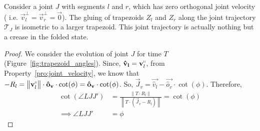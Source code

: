 \begin{lemma}
\label{lem:trapezoid_gluing_parallel}
Consider a joint $J$ with segments $l$ and $r$,
which has zero orthogonal joint velocity ( i.e. $\vec v_l^\perp = \vec v_r^\perp = \vec 0$).
The gluing of trapezoids $Z_l$ and $Z_r$ along the joint trajectory $\mathcal T_J$ is isometric to a larger trapezoid.
This joint trajectory is actually nothing but a crease in the folded state.
\end{lemma}
\begin{proof}
We consider the evolution of joint $J$ for time $T$ (Figure~\ref{fig:trapezoid_angles}).
Since, $\vec{\hat v_l} = \vec v_l^\shortparallel$, from Property~\ref{pro:joint_velocity},
we know that $-R_l = \left\| \vec v_l^\shortparallel\right\|\cdot\vec{\hat o_v}\cdot\cot(\phi) = \vec{\hat o_v}\cdot\cot(\phi)$.
So, $\vec J_v = \vec{\hat v_l} - \vec{\hat o_v}\cdot\cot(\phi)$.  Therefore,
\begin{align}
    \cot(\angle LJJ') &= \frac{\left\| T\cdot R_l\right\|}{ \left\| T\cdot(\vec J_v - R_l)\right\|} = \cot(\phi)\\
\implies \angle LJJ' &= \phi
\end{align}
\end{proof}

